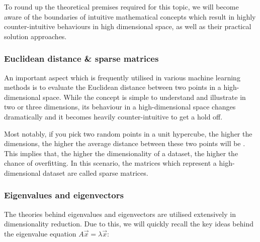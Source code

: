 
To round up the theoretical premises required for this topic, we will become aware of the boundaries of intuitive mathematical concepts which result in highly counter-intuitive behaviours in high dimensional space, as well as their practical solution approaches.

\subsubsection{Euclidean distance \& sparse matrices}

An important aspect which is frequently utilised in various machine learning methods is to evaluate the Euclidean distance between two points in a high-dimensional space.
While the concept is simple to understand and illustrate in two or three dimensions, its behaviour in a high-dimensional space changes dramatically and it becomes heavily counter-intuitive to get a hold off.

Most notably, if you pick two random points in a unit hypercube, the higher the dimensions, the higher the average distance between these two points will be \cite{HandsOnMLCh8}.
This implies that, the higher the dimensionality of a dataset, the higher the chance of overfitting.
In this scenario, the matrices which represent a high-dimensional dataset are called sparse matrices.

\vspace{2mm}



\subsubsection{Eigenvalues and eigenvectors}

The theories behind eigenvalues and eigenvectors are utilised extensively in dimensionality reduction.
Due to this, we will quickly recall the key ideas behind the eigenvalue equation $A \overrightarrow{x} = \lambda \overrightarrow{x}$:


